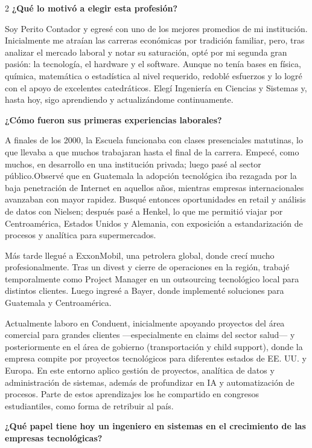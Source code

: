 \documentclass[12pt,spanish,Letterpaper,openany]{book}
\begin{document}
\begin {multicols}{2}
\textbf{¿Qué lo motivó a elegir esta profesión?}

Soy Perito Contador y egresé con uno de los mejores promedios de mi institución. Inicialmente me atraían las carreras económicas por tradición familiar, pero, tras analizar el mercado laboral y notar su saturación, opté por mi segunda gran pasión: la tecnología, el hardware y el software. Aunque no tenía bases en física, química, matemática o estadística al nivel requerido, redoblé esfuerzos y lo logré con el apoyo de excelentes catedráticos. Elegí Ingeniería en Ciencias y Sistemas y, hasta hoy, sigo aprendiendo y actualizándome continuamente.

\textbf{¿Cómo fueron sus primeras experiencias laborales?}

A finales de los 2000, la Escuela funcionaba con clases presenciales matutinas, lo que llevaba a que muchos trabajaran hasta el final de la carrera. Empecé, como muchos, en desarrollo en una institución privada; luego pasé al sector público.Observé que en Guatemala la adopción tecnológica iba rezagada por la baja penetración de Internet en aquellos años, mientras empresas internacionales avanzaban con mayor rapidez. Busqué entonces oportunidades en retail y análisis de datos con Nielsen; después pasé a Henkel, lo que me permitió viajar por Centroamérica, Estados Unidos y Alemania, con exposición a estandarización de procesos y analítica para supermercados.

Más tarde llegué a ExxonMobil, una petrolera global, donde crecí mucho profesionalmente. Tras un divest y cierre de operaciones en la región, trabajé temporalmente como Project Manager en un outsourcing tecnológico local para distintos clientes. Luego ingresé a Bayer, donde implementé soluciones para Guatemala y Centroamérica.

Actualmente laboro en Conduent, inicialmente apoyando proyectos del área comercial para grandes clientes ---especialmente en claims del sector salud--- y posteriormente en el área de gobierno (transportación y child support), donde la empresa compite por proyectos tecnológicos para diferentes estados de EE. UU. y Europa. En este entorno aplico gestión de proyectos, analítica de datos y administración de sistemas, además de profundizar en IA y automatización de procesos. Parte de estos aprendizajes los he compartido en congresos estudiantiles, como forma de retribuir al país.

\textbf{¿Qué papel tiene hoy un ingeniero en sistemas en el crecimiento de las empresas tecnológicas?}


\end{multicols}
\end{document}
